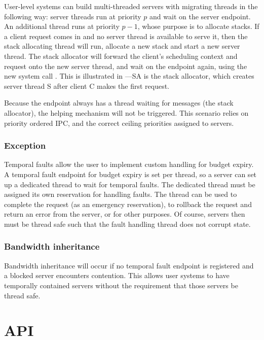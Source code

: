 User-level systems can build multi-threaded servers with migrating threads in the following way: server threads run at priority $p$ and wait on the server endpoint.
An additional thread runs at priority $p - 1$, whose purpose is to allocate stacks.
If a client request comes in and no server thread is available to serve it, then the stack allocating thread will run, allocate a new stack and start a new server thread.
The stack allocator will forward the client's scheduling context and request onto the new server thread, and wait on the endpoint again, using the new system call \sendrecv.
This is illustrated in ---SA is the stack allocator, which creates server thread S after client C makes the first request.

Because the endpoint always has a thread waiting for messages (the stack allocator), the helping mechanism will not be triggered.
This scenario relies on priority ordered \gls{IPC}, and the correct ceiling priorities assigned to servers.

\subsubsection{Exception}

Temporal faults allow the user to implement custom handling for budget expiry.
A temporal fault endpoint for budget expiry is set per thread, so a server can set up a dedicated thread to wait for temporal faults.
The dedicated thread must be assigned its own reservation for handling faults.
The thread can be used to complete the request (as an emergency reservation), to rollback the request and return an error from the server, or for other purposes.
Of course, servers then must be thread safe such that the fault handling thread does not corrupt state.

\subsubsection{Bandwidth inheritance}

Bandwidth inheritance will occur if no temporal fault endpoint is registered and a blocked server encounters contention.
This allows user systems to have temporally contained servers without the requirement that those servers be thread safe.


\section{API}
\label{s:new-api}

